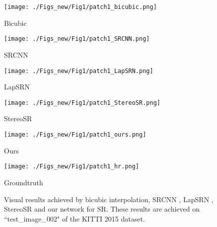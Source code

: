 \documentclass[10pt,twocolumn,letterpaper]{article}
\begin{document}
\begin{figure}[bt]
	\centering
	\begin{minipage}[t]{0.9\linewidth}
\begin{minipage}[t]{0.339\linewidth}
			\texttt{[image: ./Figs\_new/Fig1/patch1\_bicubic.png]}
			\setlength{\abovecaptionskip}{-11pt}
			\setlength{\belowcaptionskip}{-2pt}
			\caption*{Bicubic}
		\end{minipage}\begin{minipage}[t]{0.339\linewidth}
			\texttt{[image: ./Figs\_new/Fig1/patch1\_SRCNN.png]}
			\setlength{\abovecaptionskip}{-11pt}
			\setlength{\belowcaptionskip}{-2pt}
			\caption*{SRCNN}
		\end{minipage}\begin{minipage}[t]{0.339\linewidth}
			\texttt{[image: ./Figs\_new/Fig1/patch1\_LapSRN.png]}
			\setlength{\abovecaptionskip}{-11pt}
			\setlength{\belowcaptionskip}{-2pt}
			\caption*{LapSRN}
		\end{minipage}
		
		\begin{minipage}[t]{0.339\linewidth}
			\texttt{[image: ./Figs\_new/Fig1/patch1\_StereoSR.png]}
			\setlength{\abovecaptionskip}{-11pt}
			\setlength{\belowcaptionskip}{0pt}
			\caption*{StereoSR}
		\end{minipage}\begin{minipage}[t]{0.339\linewidth}
			\texttt{[image: ./Figs\_new/Fig1/patch1\_ours.png]}
			\setlength{\abovecaptionskip}{-11pt}
			\setlength{\belowcaptionskip}{0pt}
			\caption*{Ours}
		\end{minipage}\begin{minipage}[t]{0.339\linewidth}
			\texttt{[image: ./Figs\_new/Fig1/patch1\_hr.png]}
			\setlength{\abovecaptionskip}{-11pt}
			\setlength{\belowcaptionskip}{0pt}
			\caption*{Groundtruth}
		\end{minipage}
	\end{minipage}

	\caption{Visual results achieved by bicubic interpolation, SRCNN \cite{2014-LearningaDeepConvolutionalNetworkforImageSuperResolution-Dong-184-199}, LapSRN \cite{2017-DeepLaplacianPyramidNetworksforFastandAccurateSuperResolution-Lai-5835-5843}, StereoSR \cite{2018-EnhancingtheSpatialResolutionofStereoImagesUsingaParallaxPrior-Jeon--} and our network for  SR. These results are achieved on ``test\_image\_002" of the KITTI 2015 dataset.}
	
	\label{fig1}
\end{figure}
\end{document}
